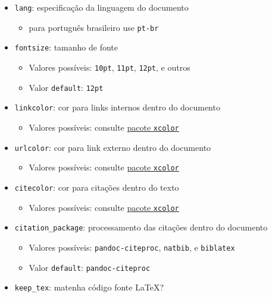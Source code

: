 \documentclass[
  10pt,
  ignorenonframetext,
]{beamer}
\providecommand{\tightlist}{%
  \setlength{\itemsep}{0pt}\setlength{\parskip}{0pt}}\usepackage{longtable,booktabs,array}
\begin{document}
\begin{frame}[fragile]
\begin{itemize}
\tightlist
\item
  \texttt{lang}: especificação da linguagem do documento

  \begin{itemize}
  \tightlist
  \item
    para português brasileiro use \texttt{pt-br}
  \end{itemize}
\item
  \texttt{fontsize}: tamanho de fonte

  \begin{itemize}
  \tightlist
  \item
    Valores possíveis: \texttt{10pt}, \texttt{11pt}, \texttt{12pt}, e
    outros
  \item
    Valor \texttt{default}: \texttt{12pt}
  \end{itemize}
\item
  \texttt{linkcolor}: cor para links internos dentro do documento

  \begin{itemize}
  \tightlist
  \item
    Valores possíveis: consulte
    \href{https://www.overleaf.com/learn/latex/Using_colours_in_LaTeX}{pacote
    \texttt{xcolor}}
  \end{itemize}
\item
  \texttt{urlcolor}: cor para link externo dentro do documento

  \begin{itemize}
  \tightlist
  \item
    Valores possíveis: consulte
    \href{https://www.overleaf.com/learn/latex/Using_colours_in_LaTeX}{pacote
    \texttt{xcolor}}
  \end{itemize}
\item
  \texttt{citecolor}: cor para citações dentro do texto

  \begin{itemize}
  \tightlist
  \item
    Valores possíveis: consulte
    \href{https://www.overleaf.com/learn/latex/Using_colours_in_LaTeX}{pacote
    \texttt{xcolor}}
  \end{itemize}
\item
  \texttt{citation\_package}: processamento das citações dentro do
  documento

  \begin{itemize}
  \tightlist
  \item
    Valores possíveis: \texttt{pandoc-citeproc}, \texttt{natbib}, e
    \texttt{biblatex}
  \item
    Valor \texttt{default}: \texttt{pandoc-citeproc}
  \end{itemize}
\item
  \texttt{keep\_tex}: matenha código fonte \LaTeX?


\end{itemize}
\end{frame}
\end{document}
